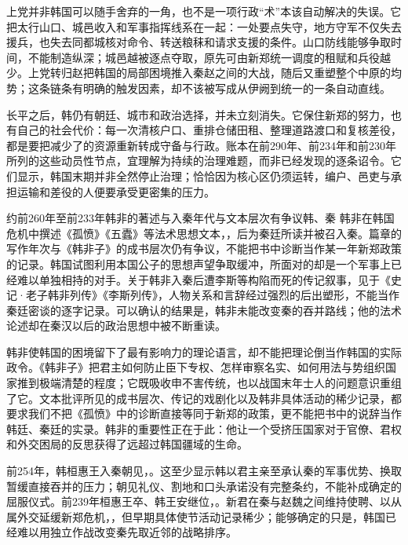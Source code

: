 上党并非韩国可以随手舍弃的一角，也不是一项行政“术”本该自动解决的失误。它把太行山口、城邑收入和军事指挥线系在一起：一处要点失守，地方守军不仅失去援兵，也失去同都城核对命令、转送粮秣和请求支援的条件。山口防线能够争取时间，不能制造纵深；城邑越被逐点夺取，原先可由新郑统一调度的租赋和兵役越少。上党转归赵把韩国的局部困境推入秦赵之间的大战，随后又重塑整个中原的均势；这条链条有明确的触发因素，却不该被写成从伊阙到统一的一条自动直线。

长平之后，韩仍有朝廷、城市和政治选择，并未立刻消失。它保住新郑的努力，也有自己的社会代价：每一次清核户口、重排仓储田租、整理道路渡口和复核差役，都是要把减少了的资源重新转成守备与行政。账本在前290年、前234年和前230年所列的这些动员性节点，宜理解为持续的治理难题，而非已经发现的逐条诏令。它们显示，韩国末期并非全然停止治理；恰恰因为核心区仍须运转，编户、邑吏与承担运输和差役的人便要承受更密集的压力。

\begin{event}{约前260年至前233年}{韩非的著述与入秦}{年代与文本层次有争议}{韩、秦}
韩非在韩国危机中撰述《孤愤》《五蠹》等法术思想文本，，后为秦廷所读并被召入秦。篇章的写作年次与《韩非子》的成书层次仍有争议，不能把书中诊断当作某一年新郑政策的记录。韩国试图利用本国公子的思想声望争取缓冲，所面对的却是一个军事上已经难以单独相持的对手。关于韩非入秦后遭李斯等构陷而死的传记叙事，见于《史记·老子韩非列传》《李斯列传》，人物关系和言辞经过强烈的后出塑形，不能当作秦廷密谈的逐字记录。可以确认的结果是，韩非未能改变秦的吞并路线；他的法术论述却在秦汉以后的政治思想中被不断重读。
\end{event}

韩非使韩国的困境留下了最有影响力的理论语言，却不能把理论倒当作韩国的实际政令。《韩非子》把君主如何防止臣下专权、怎样审察名实、如何用法与势组织国家推到极端清楚的程度；它既吸收申不害传统，也以战国末年士人的问题意识重组了它。文本批评所见的成书层次、传记的戏剧化以及韩非具体活动的稀少记录，都要求我们不把《孤愤》中的诊断直接等同于新郑的政策，更不能把书中的说辞当作韩廷、秦廷的实录。韩非的重要性正在于此：他让一个受挤压国家对于官僚、君权和外交困局的反思获得了远超过韩国疆域的生命。

前254年，韩桓惠王入秦朝见，。这至少显示韩以君主亲至承认秦的军事优势、换取暂缓直接吞并的压力；朝见礼仪、割地和口头承诺没有完整条约，不能补成确定的屈服仪式。前239年桓惠王卒、韩王安继位，。新君在秦与赵魏之间维持使聘、以从属外交延缓新郑危机，，但早期具体使节活动记录稀少；能够确定的只是，韩国已经难以用独立作战改变秦先取近邻的战略排序。


